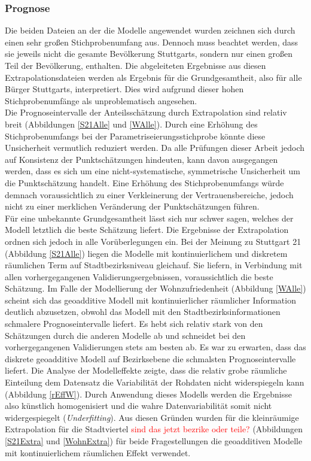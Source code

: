 \documentclass{Vorlage}
\begin{document}
\subsubsection{Prognose}
Die beiden Dateien an der die Modelle angewendet wurden zeichnen sich durch einen sehr großen Stichprobenumfang aus. Dennoch muss beachtet werden, dass sie jeweils nicht die gesamte Bevölkerung Stuttgarts, sondern nur einen großen Teil der Bevölkerung, enthalten. Die abgeleiteten Ergebnisse aus diesen Extrapolationsdateien werden als Ergebnis für die Grundgesamtheit, also für alle Bürger Stuttgarts, interpretiert. Dies wird aufgrund dieser hohen Stichprobenumfänge als unproblematisch angesehen.\\
Die Prognoseintervalle der Anteilsschätzung durch Extrapolation sind relativ breit (Abbildungen \ref{S21Alle} und \ref{WAlle}). Durch eine Erhöhung des Stichprobenumfangs bei der Parametriseierungsstichprobe könnte diese Unsicherheit vermutlich reduziert werden. Da alle Prüfungen dieser Arbeit jedoch auf Konsistenz der Punktschätzungen hindeuten, kann davon ausgegangen werden, dass es sich um eine nicht-systematische, symmetrische Unsicherheit um die Punktschätzung handelt. Eine Erhöhung des Stichprobenumfangs würde demnach voraussichtlich zu einer Verkleinerung der Vertrauensbereiche, jedoch nicht zu einer merklichen Veränderung der Punktschätzungen führen.\\
Für eine unbekannte Grundgesamtheit lässt sich nur schwer sagen, welches der Modell letztlich die beste Schätzung liefert. Die Ergebnisse der Extrapolation ordnen sich jedoch in alle Vorüberlegungen ein. Bei der Meinung zu Stuttgart 21 (Abbildung \ref{S21Alle}) liegen die Modelle mit kontinuierlichem und diskretem räumlichen Term auf Stadtbezirksniveau gleichauf. Sie liefern, in Verbindung mit allen vorhergegangenen Validierungsergebnissen, voraussichtlich die beste Schätzung. Im Falle der Modellierung der Wohnzufriedenheit (Abbildung \ref{WAlle}) scheint sich das geoadditive Modell mit kontinuierlicher räumlicher Information deutlich abzusetzen, obwohl das Modell mit den Stadtbezirksinformationen schmalere Prognoseintervalle liefert. Es hebt sich relativ stark von den Schätzungen durch die anderen Modelle ab und schneidet bei den vorhergegangenen Validierungen stets am besten ab. Es war zu erwarten, dass das diskrete geoadditive Modell auf Bezirksebene die schmalsten Prognoseintervalle liefert. Die Analyse der Modelleffekte zeigte, dass die relativ grobe räumliche Einteilung dem Datensatz die Variabilität der Rohdaten nicht widerspiegeln kann (Abbildung \ref{rEffW}). Durch Anwendung dieses Modells werden die Ergebnisse also künstlich homogenisiert und die wahre Datenvariabilität somit nicht widergespiegelt (\textit{Underfitting}). Aus diesen Gründen wurden für die kleinräumige Extrapolation für die Stadtviertel \textcolor{red}{sind das jetzt bezrike oder teile?} (Abbildungen \ref{S21Extra} und \ref{WohnExtra}) für beide Fragestellungen die geoadditiven Modelle mit kontinuierlichem räumlichen Effekt verwendet.\\
\end{document}
